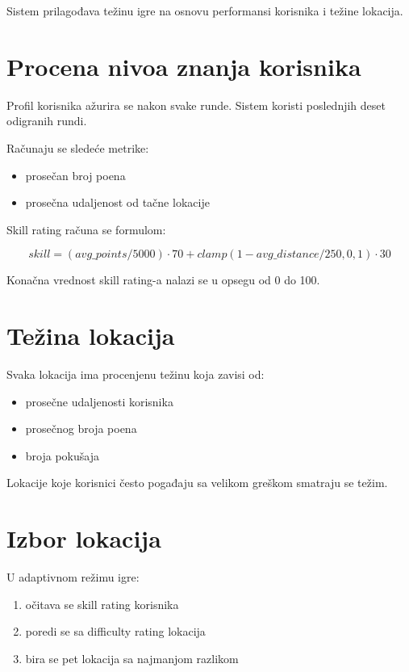 \documentclass[a4paper,12pt,projekat]{etf}
\begin{document}
Sistem prilagođava težinu igre na osnovu
performansi korisnika i težine lokacija.

\section{Procena nivoa znanja korisnika}

Profil korisnika ažurira se nakon svake runde.
Sistem koristi poslednjih deset odigranih rundi.

Računaju se sledeće metrike:

\begin{itemize}

\item prosečan broj poena
\item prosečna udaljenost od tačne lokacije

\end{itemize}

Skill rating računa se formulom:

\[
skill = (avg\_points/5000)\cdot70 +
clamp(1 - avg\_distance/250,0,1)\cdot30
\]

Konačna vrednost skill rating-a nalazi se
u opsegu od 0 do 100.

\section{Težina lokacija}

Svaka lokacija ima procenjenu težinu
koja zavisi od:

\begin{itemize}

\item prosečne udaljenosti korisnika
\item prosečnog broja poena
\item broja pokušaja
\end{itemize}

Lokacije koje korisnici često pogađaju
sa velikom greškom smatraju se težim.

\section{Izbor lokacija}

U adaptivnom režimu igre:

\begin{enumerate}

\item očitava se skill rating korisnika
\item poredi se sa difficulty rating lokacija
\item bira se pet lokacija sa najmanjom razlikom

\end{enumerate}
\end{document}
